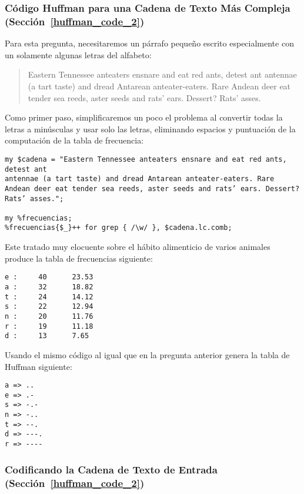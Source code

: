 \subsubsection{Código Huffman para una Cadena de Texto Más Compleja (Sección~\ref{huffman_code_2})}

Para esta pregunta, necesitaremos un párrafo pequeño escrito especialmente
con un solamente algunas letras del alfabeto:

\begin{quote}
Eastern Tennessee anteaters ensnare and eat red ants, detest ant
antennae (a tart taste) and dread Antarean anteater-eaters. Rare
Andean deer eat tender sea reeds, aster seeds and rats’ ears. Dessert?
Rats’ asses.
\end{quote}

Como primer paso, simplificaremos un poco el problema al convertir
todas la letras a minúsculas y usar solo las letras, eliminando 
espacios y puntuación de la computación de la tabla de frecuencia:

\begin{verbatim}
my $cadena = "Eastern Tennessee anteaters ensnare and eat red ants, detest ant
antennae (a tart taste) and dread Antarean anteater-eaters. Rare
Andean deer eat tender sea reeds, aster seeds and rats’ ears. Dessert?
Rats’ asses."; 

my %frecuencias;
%frecuencias{$_}++ for grep { /\w/ }, $cadena.lc.comb;
\end{verbatim}

Este tratado muy elocuente sobre el hábito alimenticio de varios
animales produce la tabla de frecuencias siguiente:

\begin{verbatim}
e :     40      23.53
a :     32      18.82
t :     24      14.12
s :     22      12.94
n :     20      11.76
r :     19      11.18
d :     13      7.65
\end{verbatim}

Usando el mismo código al igual que en la pregunta anterior genera
la tabla de Huffman siguiente:

\begin{verbatim}
a => ..
e => .-
s => -.-
n => -..
t => --.
d => ---.
r => ----
\end{verbatim}

\subsubsection{Codificando la Cadena de Texto de Entrada (Sección~\ref{huffman_code_2})}

